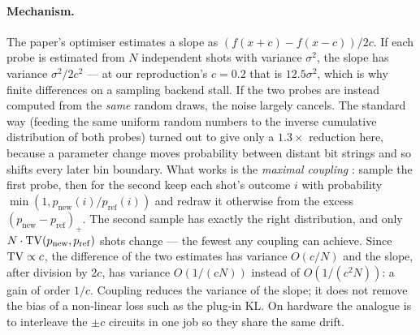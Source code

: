 \paragraph{Mechanism.}
The paper's optimiser estimates a slope as $(f(x+c)-f(x-c))/2c$.  If each probe is estimated
from $N$ independent shots with variance $\sigma^2$, the slope has variance $\sigma^2/2c^2$ ---
at our reproduction's $c=0.2$ that is $12.5\sigma^2$, which is why finite differences on a
sampling backend stall.  If the two probes are instead computed from the \emph{same} random draws, the
noise largely cancels.  The standard way (feeding the same uniform random numbers to the inverse
cumulative distribution of both probes) turned out to give only a $1.3\times$ reduction here,
because a parameter change moves probability between distant bit strings and so shifts every
later bin boundary.  What works is the \emph{maximal coupling} \cite{lindvall}: sample the first
probe, then for the second keep each shot's outcome $i$ with probability
$\min(1, p_{\mathrm{new}}(i)/p_{\mathrm{ref}}(i))$ and redraw it otherwise from the excess
$(p_{\mathrm{new}}-p_{\mathrm{ref}})_+$.  The second sample has exactly the right distribution,
and only $N\cdot\mathrm{TV}(p_{\mathrm{new}},p_{\mathrm{ref}})$ shots change --- the fewest any coupling
can achieve.  Since $\mathrm{TV}\propto c$, the difference of the two estimates has variance $O(c/N)$ and
the slope, after division by $2c$, has variance $O(1/(cN))$ instead of $O(1/(c^2N))$: a gain of
order $1/c$.  Coupling reduces the variance of the slope; it does not remove the bias of a
non-linear loss such as the plug-in KL.  On hardware the analogue is to interleave the $\pm c$ circuits in one job so they
share the same drift.

